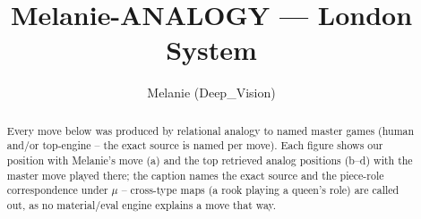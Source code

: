 \documentclass[11pt]{article}
\title{Melanie-ANALOGY — London System}
\author{Melanie (Deep\_Vision)}
\date{}
\begin{document}
\maketitle

\begin{abstract}Every move below was produced by relational analogy to named master games (human and/or top-engine -- the exact source is named per move). Each figure shows our position with Melanie's move (a) and the top retrieved analog positions (b--d) with the master move played there; the caption names the exact source and the piece-role correspondence under $\mu$ -- cross-type maps (a rook playing a queen's role) are called out, as no material/eval engine explains a move that way.\end{abstract}

\begin{figure}[p]\centering
\begin{subfigure}{0.46\textwidth}\centering
\resizebox{\linewidth}{!}{%
\newchessgame
\chessboard[
  setfen={rnbq1rk1/pp3ppp/3Bpn2/2pp4/3P4/3BPN2/PPP2PPP/RN1QK2R b KQ - 0 7},
  showmover=false,
  pgfstyle=straightmove, color=movearrow, markmove={d8-d6}
]}
\caption{}
\end{subfigure}\hfill
\begin{subfigure}{0.46\textwidth}\centering
\resizebox{\linewidth}{!}{%
\newchessgame
\chessboard[
  setfen={rn1qk2r/1pp1bpp1/p3pn1p/3pN3/2PP4/1P1bP3/PB3PPP/RN1Q1RK1 w kq - 0 11},
  showmover=false,
  pgfstyle=straightmove, color=movearrow, markmove={e5-d3}
]}
\caption{}
\end{subfigure}
\\[4pt]
\begin{subfigure}{0.46\textwidth}\centering
\resizebox{\linewidth}{!}{%
\newchessgame
\chessboard[
  setfen={rn1qkb1r/pp4pp/2p1ppn1/3pP3/3P4/2Pb1N2/PP3PPP/RNBQ1RK1 w kq - 0 9},
  showmover=false,
  pgfstyle=straightmove, color=movearrow, markmove={d1-d3}
]}
\caption{}
\end{subfigure}\hfill
\begin{subfigure}{0.46\textwidth}\centering
\resizebox{\linewidth}{!}{%
\newchessgame
\chessboard[
  setfen={rn1qkb1r/pp4pp/2p1ppn1/3pP3/3P4/2Pb1N2/PP3PPP/RNBQ1RK1 w kq - 0 9},
  showmover=false,
  pgfstyle=straightmove, color=movearrow, markmove={d1-d3}
]}
\caption{}
\end{subfigure}

\end{figure}
\end{document}
